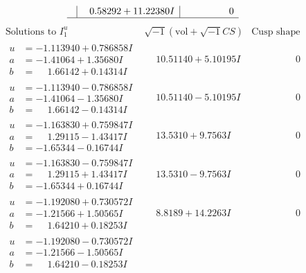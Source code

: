 \documentclass[1p]{elsarticle_modified}
\theoremstyle{definition}
\newcommand{\I}{\sqrt{-1}}
\begin{document}
$$\begin{array}{c|c|c}
 & \phantom{-}0.58292 + 11.22380 I & \phantom{-0.000000 } 0\\
 \hline 
 \end{array}$$\newpage$$\begin{array}{c|c|c}  
\text{Solutions to }I^u_{1}& \I (\text{vol} + \sqrt{-1}CS) & \text{Cusp shape}\\
 \hline 
\begin{aligned}
u &= -1.113940 + 0.786858 I \\
a &= -1.41064 + 1.35680 I \\
b &= \phantom{-}1.66142 + 0.14314 I\end{aligned}
 & \phantom{-}10.51140 + 5.10195 I & \phantom{-0.000000 } 0 \\ \hline\begin{aligned}
u &= -1.113940 - 0.786858 I \\
a &= -1.41064 - 1.35680 I \\
b &= \phantom{-}1.66142 - 0.14314 I\end{aligned}
 & \phantom{-}10.51140 - 5.10195 I & \phantom{-0.000000 } 0 \\ \hline\begin{aligned}
u &= -1.163830 + 0.759847 I \\
a &= \phantom{-}1.29115 - 1.43417 I \\
b &= -1.65344 - 0.16744 I\end{aligned}
 & \phantom{-}13.5310 + 9.7563 I & \phantom{-0.000000 } 0 \\ \hline\begin{aligned}
u &= -1.163830 - 0.759847 I \\
a &= \phantom{-}1.29115 + 1.43417 I \\
b &= -1.65344 + 0.16744 I\end{aligned}
 & \phantom{-}13.5310 - 9.7563 I & \phantom{-0.000000 } 0 \\ \hline\begin{aligned}
u &= -1.192080 + 0.730572 I \\
a &= -1.21566 + 1.50565 I \\
b &= \phantom{-}1.64210 + 0.18253 I\end{aligned}
 & \phantom{-}8.8189 + 14.2263 I & \phantom{-0.000000 } 0 \\ \hline\begin{aligned}
u &= -1.192080 - 0.730572 I \\
a &= -1.21566 - 1.50565 I \\
b &= \phantom{-}1.64210 - 0.18253 I\end{aligned}

\end{array}$$
\end{document}
